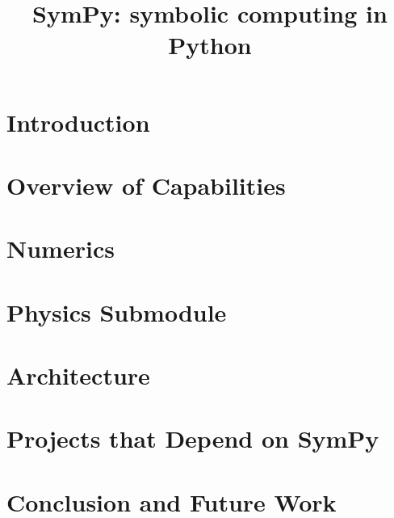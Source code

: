 \documentclass[fleqn,10pt,lineno,numbers]{wlpeerj} %
\title{SymPy: symbolic computing in Python}
\begin{document}
\flushbottom
\maketitle
\thispagestyle{empty}

\section{Introduction}




\section{Overview of Capabilities}
\label{sec:features}




\section{Numerics}
\label{sec:numerics}




\section{Physics Submodule}
\label{sec:domain_specific}



\section{Architecture}
\label{sec:architecture}



\section{Projects that Depend on SymPy}
\label{sec:other-proj}


\section{Conclusion and Future Work}
\label{sec:conclusion}




\end{document}
